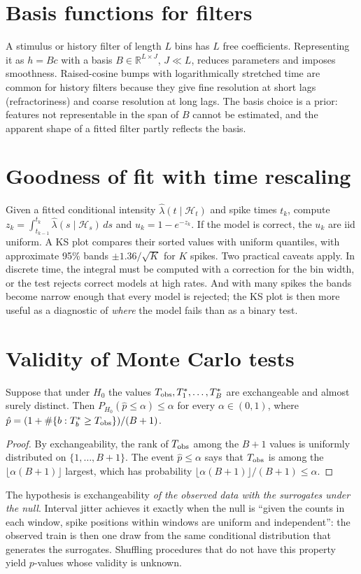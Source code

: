 \section{Basis functions for filters}
A stimulus or history filter of length $L$ bins has $L$ free coefficients. Representing it as $h=Bc$ with a basis $B\in\mathbb R^{L\times J}$, $J\ll L$, reduces parameters and imposes smoothness. Raised-cosine bumps with logarithmically stretched time are common for history filters because they give fine resolution at short lags (refractoriness) and coarse resolution at long lags. The basis choice is a prior: features not representable in the span of $B$ cannot be estimated, and the apparent shape of a fitted filter partly reflects the basis.

\section{Goodness of fit with time rescaling}
Given a fitted conditional intensity $\hat\lambda(t\mid\mathcal H_t)$ and spike times $t_k$, compute $z_k=\int_{t_{k-1}}^{t_k}\hat\lambda(s\mid\mathcal H_s)\,ds$ and $u_k=1-e^{-z_k}$. If the model is correct, the $u_k$ are iid uniform. A KS plot compares their sorted values with uniform quantiles, with approximate 95\% bands $\pm1.36/\sqrt K$ for $K$ spikes. Two practical caveats apply. In discrete time, the integral must be computed with a correction for the bin width, or the test rejects correct models at high rates. And with many spikes the bands become narrow enough that every model is rejected; the KS plot is then more useful as a diagnostic of \emph{where} the model fails than as a binary test.

\section{Validity of Monte Carlo tests}
\begin{proposition}
Suppose that under $H_0$ the values $T_{\rm obs},T_1^\ast,\ldots,T_B^\ast$ are exchangeable and almost surely distinct. Then $P_{H_0}(\hat p\le\alpha)\le\alpha$ for every $\alpha\in(0,1)$, where $\hat p=(1+\#\{b:T_b^\ast\ge T_{\rm obs}\})/(B+1)$.
\end{proposition}
\begin{proof}
By exchangeability, the rank of $T_{\rm obs}$ among the $B+1$ values is uniformly distributed on $\{1,\ldots,B+1\}$. The event $\hat p\le\alpha$ says that $T_{\rm obs}$ is among the $\lfloor\alpha(B+1)\rfloor$ largest, which has probability $\lfloor\alpha(B+1)\rfloor/(B+1)\le\alpha$.
\end{proof}
The hypothesis is exchangeability \emph{of the observed data with the surrogates under the null}. Interval jitter achieves it exactly when the null is ``given the counts in each window, spike positions within windows are uniform and independent'': the observed train is then one draw from the same conditional distribution that generates the surrogates. Shuffling procedures that do not have this property yield $p$-values whose validity is unknown.

